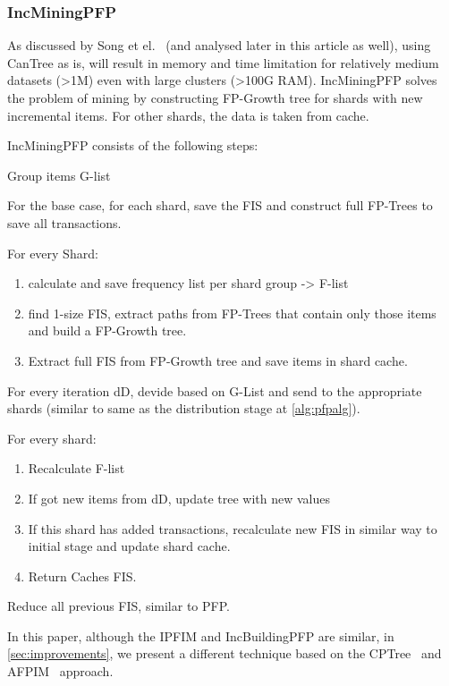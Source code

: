 \subsubsection{IncMiningPFP}
As discussed by Song et el.~\cite{song2017} (and analysed later in this article as well), using CanTree as is, will result in memory and time limitation for relatively medium datasets (>1M) even with large clusters (>100G RAM).  IncMiningPFP solves the problem of mining by constructing FP-Growth tree for shards with new incremental items. For other shards, the data is taken from cache.

IncMiningPFP consists of the following steps:
\begin{steps}
	\item Group items G-list
	\item For the base case, for each shard, save the FIS and construct full FP-Trees to save all transactions. 
	\item For every Shard:
			\begin{enumerate}
			\item calculate and save frequency list per shard group -> F-list
			\item find 1-size FIS, extract paths from FP-Trees that contain only those items and build a FP-Growth tree.
			\item Extract full FIS from FP-Growth tree and save items in shard cache.
			\end{enumerate}
	\item For every iteration dD, devide based on G-List and send to the appropriate shards (similar to same as the distribution  stage at \autoref{alg:pfpalg}).
	\item For every shard: 
				\begin{enumerate}
				\item Recalculate F-list
				\item If got new items from dD, update tree with new values
				\item If this shard has added transactions, recalculate new FIS in similar way to initial stage and update shard cache. 
				\item Return Caches FIS.
				\end{enumerate}
	\item Reduce all previous FIS, similar to PFP.
\end{steps}

In this paper, although the IPFIM and IncBuildingPFP are similar, in \autoref{sec:improvements}, we present a different technique based on the CPTree~\cite{tanbeer2009efficient} and AFPIM~\cite{koh2004efficient} approach.

